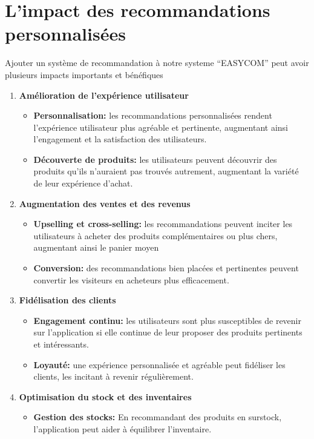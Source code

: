 \documentclass[edit,12pt,a4paper,ChapStyle,oneside,doubleinterligne]{report}
\begin{document}
\section{L'impact des recommandations personnalisées}
Ajouter un système de recommandation à notre systeme “EASYCOM” peut avoir plusieurs impacts importants et bénéfiques
\begin{enumerate}
    \item \textbf{Amélioration de l'expérience utilisateur} \begin{itemize}
             \item \textbf{Personnalisation: }les recommandations personnalisées rendent l'expérience utilisateur plus agréable et pertinente, augmentant ainsi l'engagement et la satisfaction des utilisateurs.
             \item \textbf{Découverte de produits: }les utilisateurs peuvent découvrir des produits qu'ils n'auraient pas trouvés autrement, augmentant la variété de leur expérience d'achat.
            \end{itemize}
    \item \textbf{Augmentation des ventes et des revenus} \begin{itemize}
        \item \textbf{Upselling et cross-selling: }les recommandations peuvent inciter les utilisateurs à acheter des produits complémentaires ou plus chers, augmentant ainsi le panier moyen
        \item \textbf{Conversion: }des recommandations bien placées et pertinentes peuvent convertir les visiteurs en acheteurs plus efficacement.
    \end{itemize}
    \item \textbf{Fidélisation des clients} \begin{itemize}
        \item \textbf{Engagement continu: }les utilisateurs sont plus susceptibles de revenir sur l'application si elle continue de leur proposer des produits pertinents et intéressants.
        \item \textbf{Loyauté: }une expérience personnalisée et agréable peut fidéliser les clients, les incitant à revenir régulièrement.
    \end{itemize}
    \item \textbf{Optimisation du stock et des inventaires} \begin{itemize}
        \item \textbf{Gestion des stocks: }En recommandant des produits en surstock, l'application peut aider à équilibrer l'inventaire.

\end{itemize}
\end{enumerate}
\end{document}

